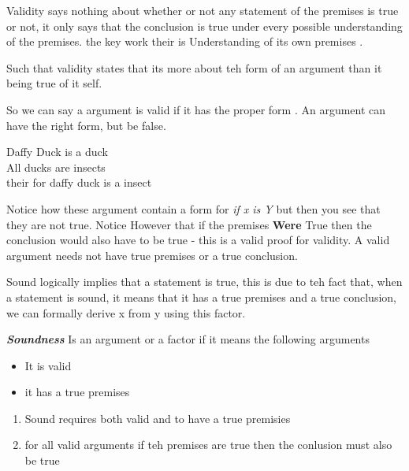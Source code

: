 \documentclass{article}
\theoremstyle{mytheoremstyle}
\theoremstyle{mytheoremstyle}
\theoremstyle{myproblemstyle}
\begin{document}
\begin{theorem}
    Validity says nothing about whether or not any statement of the premises is true or not, it only says that the conclusion is true under every possible understanding of the premises.
    the key work their is Understanding of its own premises .

    Such that validity states that its more about teh form of an argument than it being true of it self.
\end{theorem}

So we can say a argument is valid if it has the proper form . An argument can have the right form, but be false.
\\
\begin{tt}
Daffy Duck is a duck \\
All ducks are insects \\
their for daffy duck is a insect \\
\end{tt}

Notice how these argument contain a form for \textit{if x is Y} but then you see that they are not true.
Notice However that if the premises \textbf{Were} True then the conclusion would also have to be true - this is a valid proof for validity. A valid argument needs not have true premises or a true conclusion.

\begin{theorem}
    Sound logically implies that a statement is true, this is due to teh fact that, when a statement is sound, it means that it has a true premises and a true conclusion, we can formally derive x from y using this factor.

    \textbf{\textit{Soundness}} Is an argument or a factor if it means the following arguments

    \begin{itemize}
        \item It is valid
        \item it has a true premises
    \end{itemize}
\end{theorem}

\begin{enumerate}
  \item  Sound requires both valid and to have a true premisies
  \item for all valid arguments if teh premises are true then the conlusion must also be true
\end{enumerate}
\end{document}

